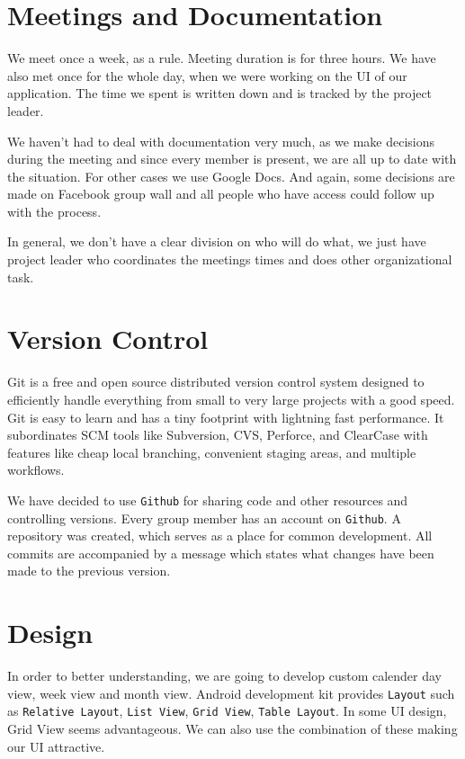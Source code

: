 \documentclass[10pt,a4paper]{report}
\begin{document}
\section{Meetings and Documentation}
We meet once a week, as a rule. Meeting duration is for three hours. We have also met once for the whole day, when we were working on the UI of our application. The time we spent is written down and is tracked by the project leader. 

We haven’t had to deal with documentation very much, as we make decisions during the meeting and since every member is present, we are all up to date with the situation. For other cases we use Google Docs. And again, some decisions are made on Facebook group wall and all people who have access could follow up with the process. 

In general, we don’t have a clear division on who will do what, we just have project leader who coordinates the meetings times and does other organizational task.

\section{Version Control}
Git is a free and open source distributed version control system designed to efficiently handle everything from small to very large projects with a good speed. Git is easy to learn and has a tiny footprint with lightning fast performance. It subordinates SCM tools like Subversion, CVS, Perforce, and ClearCase with features like cheap local branching, convenient staging areas, and multiple workflows.

We have decided to use \texttt{Github} for sharing code and other resources and controlling versions. Every group member has an account on \texttt{Github}. A repository was created, which serves as a place for common development. All commits are accompanied by a message which states what changes have been made to the previous version.

\section{Design}

In order to better understanding, we are going to develop custom calender day view, week view and month view. Android development kit provides \texttt{Layout} such as \texttt{Relative Layout}, \texttt{List View}, \texttt{Grid View}, \texttt{Table Layout}. In some UI design, Grid View seems advantageous. We can also use the combination of these making our UI attractive. 
\end{document}
